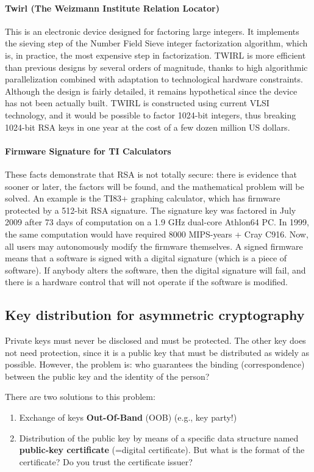 \paragraph{Twirl (The Weizmann Institute Relation Locator)}
This is an electronic device designed for factoring large integers. It implements the sieving step of the Number Field Sieve integer factorization algorithm, which is, in practice, the most expensive step in factorization. TWIRL is more efficient than previous designs by several orders of magnitude, thanks to high algorithmic parallelization combined with adaptation to technological hardware constraints. Although the design is fairly detailed, it remains hypothetical since the device has not been actually built. TWIRL is constructed using current VLSI technology, and it would be possible to factor 1024-bit integers, thus breaking 1024-bit RSA keys in one year at the cost of a few dozen million US dollars.


\paragraph{Firmware Signature for TI Calculators}
These facts demonstrate that RSA is not totally secure: there is evidence that sooner or later, the factors will be found, and the mathematical problem will be solved. An example is the TI83+ graphing calculator, which has firmware protected by a 512-bit RSA signature. The signature key was factored in July 2009 after 73 days of computation on a 1.9 GHz dual-core Athlon64 PC. In 1999, the same computation would have required 8000 MIPS-years + Cray C916. Now, all users may autonomously modify the firmware themselves. A signed firmware means that a software is signed with a digital signature (which is a piece of software). If anybody alters the software, then the digital signature will fail, and there is a hardware control that will not operate if the software is modified.


\subsection{Key distribution for asymmetric cryptography}
Private keys must never be disclosed and must be protected. The other key does not need protection, since it is a public key that must be distributed as widely as possible. However, the problem is: who guarantees the binding (correspondence) between the public key and the identity of the person?

There are two solutions to this problem:
\begin{enumerate}
	\item Exchange of keys \textbf{Out-Of-Band} (OOB) (e.g., key party!)
	\item Distribution of the public key by means of a specific data structure named \textbf{public-key certificate} (=digital certificate).
	      But what is the format of the certificate? Do you trust the certificate issuer?
\end{enumerate}



